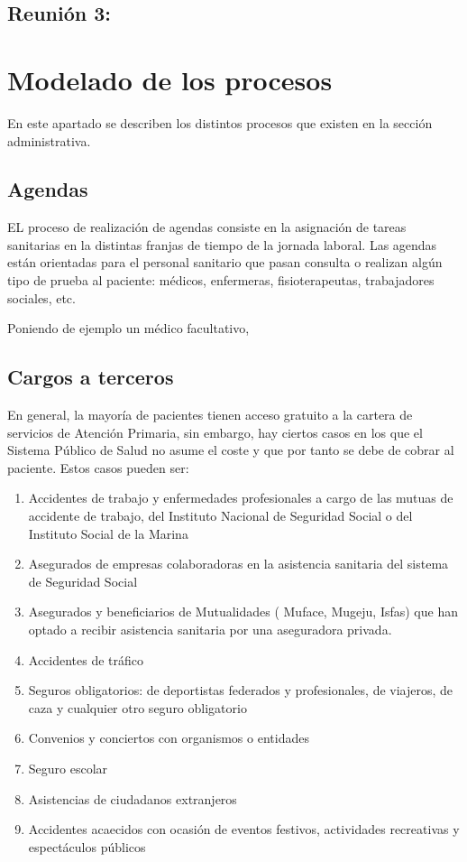 \subsection{Reunión 3: }

\section{Modelado de los procesos}

En este apartado se describen los distintos procesos que existen en la sección administrativa. 

\subsection{Agendas}

EL proceso de realización de agendas consiste en la asignación de tareas sanitarias en la distintas franjas de tiempo de la jornada laboral. Las agendas están orientadas para el personal sanitario que pasan consulta o realizan algún tipo de prueba al paciente: médicos, enfermeras, fisioterapeutas, trabajadores sociales, etc.

Poniendo de ejemplo un médico facultativo, 

\subsection{Cargos a terceros}

En general, la mayoría de pacientes tienen acceso gratuito a la cartera de servicios de Atención Primaria, sin embargo, hay ciertos casos en los que el Sistema Público de Salud no asume el coste y que por tanto se debe de cobrar al paciente. Estos casos pueden ser:

\begin{enumerate}
    \item Accidentes de trabajo y enfermedades profesionales a cargo de las mutuas de accidente de trabajo, del Instituto Nacional de Seguridad Social o del Instituto Social de la Marina
    \item Asegurados de empresas colaboradoras en la asistencia sanitaria del sistema de Seguridad Social
    \item Asegurados y beneficiarios de Mutualidades ( Muface, Mugeju, Isfas) que han optado a recibir asistencia sanitaria por una aseguradora privada.
    \item Accidentes de tráfico
    \item Seguros obligatorios: de deportistas federados y profesionales, de viajeros, de caza y cualquier otro seguro obligatorio
    \item Convenios y conciertos con organismos o entidades
    \item Seguro escolar
    \item Asistencias de ciudadanos extranjeros
    \item Accidentes acaecidos con ocasión de eventos festivos, actividades recreativas y espectáculos públicos
\end{enumerate}

